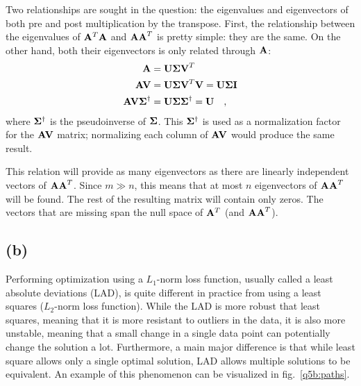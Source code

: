 \documentclass{report}
\begin{document}
Two relationships are sought in the question: the eigenvalues and eigenvectors of both pre and post multiplication by the transpose. First, the relationship between the eigenvalues of $\mathbf{A}^T\mathbf{A}$ and $\mathbf{AA}^T$ is pretty simple: they are the same. On the other hand, both their eigenvectors is only related through $\mathbf{A}$:
\begin{align*}
\mathbf{A}  &= \mathbf{U \Sigma V}^T \\
\mathbf{AV} &= \mathbf{U \Sigma V}^T \mathbf{V} = \mathbf{U \Sigma I} \\
\mathbf{AV\Sigma}^\dagger &= \mathbf{U \Sigma \Sigma}^\dagger = \mathbf{U} \quad,
\end{align*}
where $\mathbf{\Sigma}^\dagger$ is the pseudoinverse of $\mathbf{\Sigma}$. This $\mathbf{\Sigma}^\dagger$ is used as a normalization factor for the $\mathbf{AV}$ matrix; normalizing each column of $\mathbf{AV}$ would produce the same result.

This relation will provide as many eigenvectors as there are linearly independent vectors of $\mathbf{AA}^T$. Since $m \gg n$, this means that at most $n$ eigenvectors of $\mathbf{AA}^T$ will be found. The rest of the resulting matrix will contain only zeros. The vectors that are missing span the null space of $\mathbf{A}^T$ (and $\mathbf{AA}^T$).

\subsection{(b)}

Performing optimization using a $L_1$-norm loss function, usually called a least absolute deviations (LAD), is quite different in practice from using a least squares ($L_2$-norm loss function). While the LAD is more robust that least squares, meaning that it is more resistant to outliers in the data, it is also more unstable, meaning that a small change in a single data point can potentially change the solution a lot. Furthermore, a main major difference is that while least square allows only a single optimal solution, LAD allows multiple solutions to be equivalent. An example of this phenomenon can be visualized in fig.~\ref{q5b:paths}.
\end{document}
